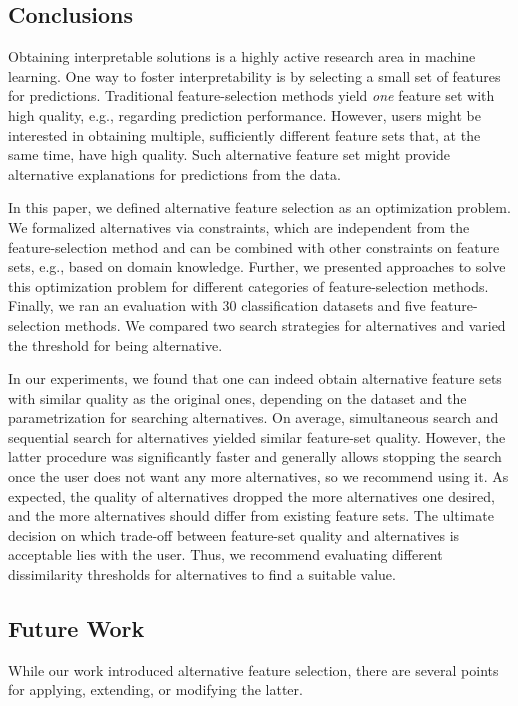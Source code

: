 \documentclass{article}
\theoremstyle{definition}
\begin{document}
\subsection{Conclusions}

Obtaining interpretable solutions is a highly active research area in machine learning.
One way to foster interpretability is by selecting a small set of features for predictions.
Traditional feature-selection methods yield \emph{one} feature set with high quality, e.g., regarding prediction performance.
However, users might be interested in obtaining multiple, sufficiently different feature sets that, at the same time, have high quality.
Such alternative feature set might provide alternative explanations for predictions from the data.

In this paper, we defined alternative feature selection as an optimization problem.
We formalized alternatives via constraints, which are independent from the feature-selection method and can be combined with other constraints on feature sets, e.g., based on domain knowledge.
Further, we presented approaches to solve this optimization problem for different categories of feature-selection methods.
Finally, we ran an evaluation with 30 classification datasets and five feature-selection methods.
We compared two search strategies for alternatives and varied the threshold for being alternative.

In our experiments, we found that one can indeed obtain alternative feature sets with similar quality as the original ones, depending on the dataset and the parametrization for searching alternatives.
On average, simultaneous search and sequential search for alternatives yielded similar feature-set quality.
However, the latter procedure was significantly faster and generally allows stopping the search once the user does not want any more alternatives, so we recommend using it.
As expected, the quality of alternatives dropped the more alternatives one desired, and the more alternatives should differ from existing feature sets.
The ultimate decision on which trade-off between feature-set quality and alternatives is acceptable lies with the user.
Thus, we recommend evaluating different dissimilarity thresholds for alternatives to find a suitable value.

\subsection{Future Work}

While our work introduced alternative feature selection, there are several points for applying, extending, or modifying the latter.
\end{document}
